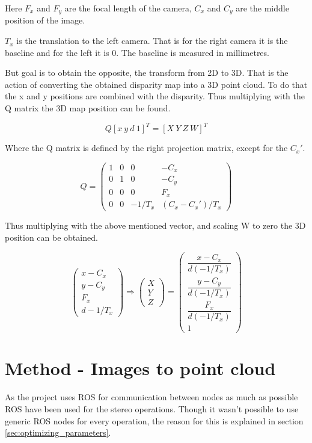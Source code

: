 Here $F_{x}$ and $F_{y}$ are the focal length of the camera, $C_{x}$ and $C_{y}$ are the middle position of the image.

$T_{x}$ is the translation to the left camera. That is for the right camera it is the baseline and for the left it is 0. The baseline is measured in millimetres. 

But goal is to obtain the opposite, the transform from 2D to 3D. That is the action of converting the obtained disparity map into a 3D point cloud. To do that the x and y positions are combined with the disparity. Thus multiplying with the Q matrix the 3D map position can be found.

\[ Q [ x \ y \ d \ 1 ]^{T} = [ X \ Y \ Z \ W ]^{T} \]

Where the Q matrix is defined by the right projection matrix, except for the $C_{x}'$.

\[
Q =
 \begin{pmatrix}
  1 & 0 & 0 & -C_{x} \\
  0 & 1 & 0 & -C_{y} \\
  0 & 0 & 0 & F_{x} \\
  0 & 0 & -1/T_{x} & (C_{x}-C_{x}')/T_{x} 
 \end{pmatrix}
\]

Thus multiplying with the above mentioned vector, and scaling W to zero the 3D position can be obtained.

\[
 \begin{pmatrix}
  x - C_{x} \\
  y - C_{y} \\
  F_{x} \\
  d-1/T_{x} 
 \end{pmatrix}
 \Rightarrow
  \begin{pmatrix}  
  X\\
  Y\\
  Z
 \end{pmatrix}
 =
 \begin{pmatrix}
  \dfrac{x - C_{x}}{ d(-1/T_{x})}  \\
  \dfrac{y - C_{y} }{ d(-1/T_{x})}\\
  \dfrac{F_{x}}{ d(-1/T_{x})}\\
  1
 \end{pmatrix}
\]

\section{Method - Images to point cloud}

As the project uses ROS for communication between nodes as much as possible ROS have been used for the stereo operations. Though it wasn't possible to use generic ROS nodes for every operation, the reason for this is explained in section \ref{sec:optimizing_parameters}. 

